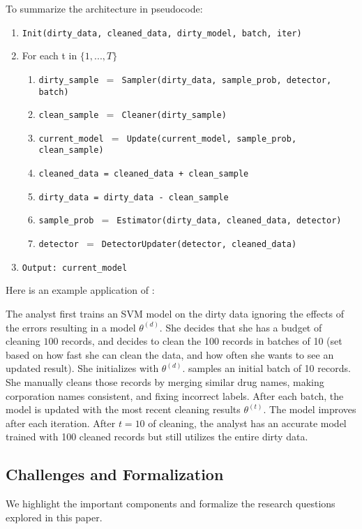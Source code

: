 To summarize the architecture in pseudocode:
\begin{enumerate}[leftmargin=1em]\scriptsize\sloppy
\item \texttt{Init(dirty\_data, cleaned\_data, dirty\_model, batch, iter)}
\item For each t in $\{1,...,T\}$
\begin{enumerate}
	\item \texttt{dirty\_sample $=$ Sampler(dirty\_data, sample\_prob, detector, batch)}
	\item \texttt{clean\_sample $=$ Cleaner(dirty\_sample)}
	\item \texttt{current\_model $=$ Update(current\_model, sample\_prob, clean\_sample)}
	\item \texttt{cleaned\_data = cleaned\_data + clean\_sample}
	\item \texttt{dirty\_data = dirty\_data - clean\_sample}
	\item \texttt{sample\_prob $=$ Estimator(dirty\_data, cleaned\_data, detector)}
	\item \texttt{detector $=$ DetectorUpdater(detector, cleaned\_data)}
\end{enumerate}
\item \texttt{Output: current\_model}
\end{enumerate}

Here is an example application of \sys:
\begin{example}
The analyst first trains an SVM model on the dirty data ignoring the effects of the errors resulting in a model $\theta^{(d)}$.
She decides that she has a budget of cleaning $100$ records, and decides to clean the 100 records in batches of 10 (set based on how fast she can clean the data, and how often she wants to see an updated result).
She initializes \sys with $\theta^{(d)}$.
\sys samples an initial batch of 10 records.
She manually cleans those records by merging similar drug names, making corporation names consistent, and fixing incorrect labels.
After each batch, the model is updated with the most recent cleaning results $\theta^{(t)}$.
The model improves after each iteration.
After $t=10$ of cleaning, the analyst has an accurate model trained with 100 cleaned records but still utilizes the entire dirty data.
\end{example}

\subsection{Challenges and Formalization}
We highlight the important components and formalize the research questions explored in this paper. 

